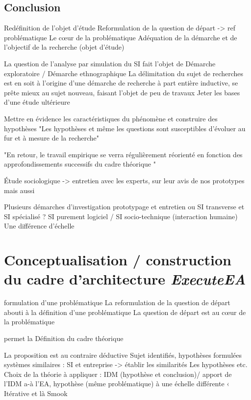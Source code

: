 	
	
		\subsection{Conclusion}
Redéfinition de l'objet d'étude
Reformulation de la question de départ -> ref problématique 
Le cœur de la problématique 
Adéquation de la démarche et de l'objectif de la recherche (objet d'étude)
	
La question de l'analyse par simulation du SI fait l'objet de 
Démarche exploratoire / Démarche ethnographique 
La délimitation du sujet de recherches est en soit à l'origine d'une démarche de 
recherche à part entière  inductive, se prête mieux au sujet nouveau, faisant 
l'objet de peu de travaux
Jeter les bases d'une étude ultérieure


Mettre en évidence les caractéristiques du phénomène et construire des 
hypothèses 
"Les hypothèses et même les questions sont susceptibles d'évoluer au fur et à 
mesure de la recherche"

"En retour, le travail empirique se verra régulièrement réorienté en fonction 
des approfondissements successifs du cadre théorique "

Étude sociologique -> entretien avec les experts, sur leur avis de nos 
prototypes mais aussi 

Plusieurs démarches d'investigation 
prototypage et entretien 
ou SI transverse et SI spécialisé ? SI purement logiciel / SI socio-technique 
(interaction humaine) 
Une différence d'échelle 
		 


	\section{Conceptualisation / construction du cadre d'architecture 
\textit{ExecuteEA}}
formulation d'une problématique 
La reformulation de la question de départ abouti à la définition d'une 
problématique 
La question de départ est au cœur de la problématique 

permet la Définition du cadre théorique 

La proposition est au contraire déductive
Sujet identifiés, hypothèses formulées
systèmes similaires : SI et entreprise -> établir les similarités
Les hypothèses etc.  
Choix de la théorie à appliquer : IDM (hypothèse et conclusion)/ apport de l'IDM 
a-à l'EA, hypothèse (même problématique) à une échelle différente  ‹
Itérative et là Smook 

